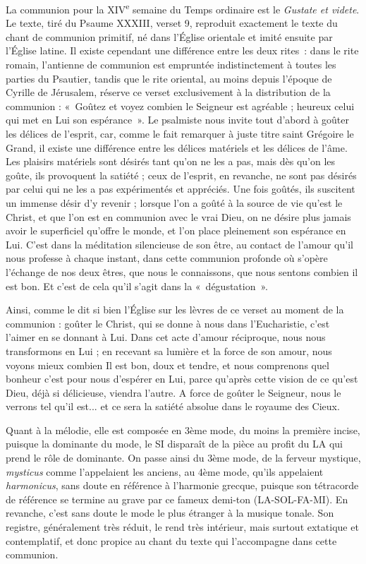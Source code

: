 \documentclass[Session2026.tex]{subfiles}
\begin{document}

La communion pour la XIV\textsuperscript{e} semaine du Temps ordinaire est le
\emph{Gustate et videte}. Le texte, tiré du Psaume XXXIII, verset 9,
reproduit exactement le texte du chant de communion primitif, né dans
l'Église orientale et imité ensuite par l'Église latine. Il existe
cependant une différence entre les deux rites~: dans le rite romain,
l'antienne de communion est empruntée indistinctement à toutes les
parties du Psautier, tandis que le rite oriental, au moins depuis
l'époque de Cyrille de Jérusalem, réserve ce verset exclusivement à la
distribution de la communion : «~Goûtez et voyez combien le Seigneur est
agréable ; heureux celui qui met en Lui son espérance~». Le psalmiste
nous invite tout d'abord à goûter les délices de l'esprit, car, comme le
fait remarquer à juste titre saint Grégoire le Grand, il existe une
différence entre les délices matériels et les délices de l'âme. Les
plaisirs matériels sont désirés tant qu'on ne les a pas, mais dès qu'on
les goûte, ils provoquent la satiété ; ceux de l'esprit, en revanche, ne
sont pas désirés par celui qui ne les a pas expérimentés et appréciés.
Une fois goûtés, ils suscitent un immense désir d'y revenir ; lorsque
l'on a goûté à la source de vie qu'est le Christ, et que l'on est en
communion avec le vrai Dieu, on ne désire plus jamais avoir le
superficiel qu'offre le monde, et l'on place pleinement son espérance en
Lui. C'est dans la méditation silencieuse de son être, au contact de
l'amour qu'il nous professe à chaque instant, dans cette communion
profonde où s'opère l'échange de nos deux êtres, que nous le
connaissons, que nous sentons combien il est bon. Et c'est de cela qu'il
s'agit dans la «~dégustation~».

Ainsi, comme le dit si bien l'Église sur les lèvres de ce verset au
moment de la communion : goûter le Christ, qui se donne à nous dans
l'Eucharistie, c'est l'aimer en se donnant à Lui. Dans cet acte d'amour
réciproque, nous nous transformons en Lui ; en recevant sa lumière et la
force de son amour, nous voyons mieux combien Il est bon, doux et
tendre, et nous comprenons quel bonheur c'est pour nous d'espérer en
Lui, parce qu'après cette vision de ce qu'est Dieu, déjà si délicieuse,
viendra l'autre. A force de goûter le Seigneur, nous le verrons tel
qu'il est... et ce sera la satiété absolue dans le royaume des
Cieux.

Quant à la mélodie, elle est composée en 3ème mode, du moins la première
incise, puisque la dominante du mode, le SI disparaît de la pièce au
profit du LA qui prend le rôle de dominante. On passe ainsi du 3ème
mode, de la ferveur mystique, \emph{mysticus} comme l'appelaient les
anciens, au 4ème mode, qu'ils appelaient \emph{harmonicus}, sans doute
en référence à l'harmonie grecque, puisque son tétracorde de référence
se termine au grave par ce fameux demi-ton (LA-SOL-FA-MI). En revanche,
c'est sans doute le mode le plus étranger à la musique tonale. Son
registre, généralement très réduit, le rend très intérieur, mais surtout
extatique et contemplatif, et donc propice au chant du texte qui
l'accompagne dans cette communion.
\end{document}
